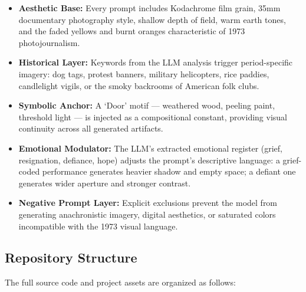 \documentclass[12pt, a4paper]{article}
\begin{document}
\begin{itemize}[leftmargin=1.5em, itemsep=4pt]
    \item \textbf{Aesthetic Base:} Every prompt includes Kodachrome film grain,
    35mm documentary photography style, shallow depth of field, warm earth tones,
    and the faded yellows and burnt oranges characteristic of 1973 photojournalism.

    \item \textbf{Historical Layer:} Keywords from the LLM analysis trigger
    period-specific imagery: dog tags, protest banners, military helicopters,
    rice paddies, candlelight vigils, or the smoky backrooms of American folk clubs.

    \item \textbf{Symbolic Anchor:} A `Door' motif --- weathered wood, peeling paint,
    threshold light --- is injected as a compositional constant, providing visual
    continuity across all generated artifacts.

    \item \textbf{Emotional Modulator:} The LLM's extracted emotional register
    (grief, resignation, defiance, hope) adjusts the prompt's descriptive language:
    a grief-coded performance generates heavier shadow and empty space; a defiant one
    generates wider aperture and stronger contrast.

    \item \textbf{Negative Prompt Layer:} Explicit exclusions prevent the model from
    generating anachronistic imagery, digital aesthetics, or saturated colors
    incompatible with the 1973 visual language.
\end{itemize}

\subsection{Repository Structure}

The full source code and project assets are organized as follows:
\end{document}
